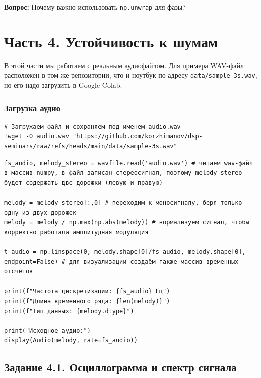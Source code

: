 \documentclass[12pt,a4paper,openany]{book}
\begin{document}
\textbf{Вопрос:} Почему важно использовать \texttt{np.\allowbreak{}unwrap} для фазы?

\section*{Часть 4. Устойчивость к шумам}

В этой части мы работаем с реальным аудиофайлом. Для примера WAV-файл расположен в том же репозитории, что и ноутбук по адресу \texttt{data/\allowbreak{}sample-3s.\allowbreak{}wav}, но его надо загрузить в Google Colab.

\subsubsection*{Загрузка аудио}

\begin{Verbatim}[fontsize=\small, breaklines, breakanywhere, frame=single, framesep=2mm]
# Загружаем файл и сохраняем под именем audio.wav
!wget -O audio.wav "https://github.com/korzhimanov/dsp-seminars/raw/refs/heads/main/data/sample-3s.wav"
\end{Verbatim}

\begin{Verbatim}[fontsize=\small, breaklines, breakanywhere, frame=single, framesep=2mm]
fs_audio, melody_stereo = wavfile.read('audio.wav') # читаем wav-файл в массив numpy, в файл записан стереосигнал, поэтому melody_stereo будет содержать две дорожки (левую и правую)

melody = melody_stereo[:,0] # переходим к моносигналу, беря только одну из двух дорожек
melody = melody / np.max(np.abs(melody)) # нормализуем сигнал, чтобы корректно работала амплитудная модуляция

t_audio = np.linspace(0, melody.shape[0]/fs_audio, melody.shape[0], endpoint=False) # для визуализации создаём также массив временных отсчётов

print(f"Частота дискретизации: {fs_audio} Гц")
print(f"Длина временного ряда: {len(melody)}")
print(f"Тип данных: {melody.dtype}")

print("Исходное аудио:")
display(Audio(melody, rate=fs_audio))
\end{Verbatim}

\subsection*{Задание 4.1. Осциллограмма и спектр сигнала}
\end{document}
